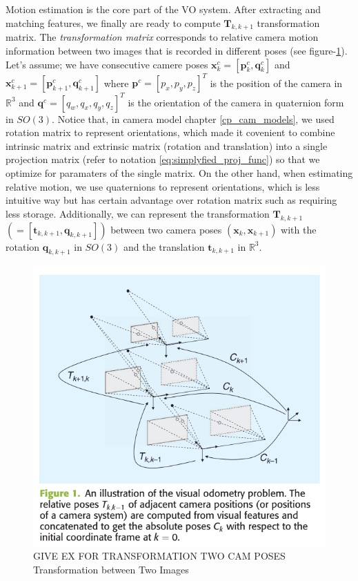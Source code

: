 \documentclass[a4paper]{report}
\numberwithin{figure}{section}
\newcommand{\R}{\mathbb{R}}
\begin{document}
Motion estimation is the core part of the VO system. After 
extracting and matching features,
we finally are ready to compute $\mathbf{T}_{k, k+1}$ transformation matrix. 
The \textit{transformation matrix} corresponds to relative camera motion information between 
two images that is recorded in different poses (see figure-\ref{fig:transformation_ij}).
Let's assume; we have 
consecutive camere poses $\mathbf{x}_k^c = [\mathbf{p}_k^c, \mathbf{q}_k^c]$ and 
$\mathbf{x}_{k+1}^c = [\mathbf{p}_{k+1}^c, \mathbf{q}_{k+1}^c]$ where 
$\mathbf{p}^c = [p_x, p_y, p_z]^T$ is the position of the camera in $\R^3$
and $\mathbf{q}^c = [q_w, q_x, q_y, q_z]^T$ is 
the orientation of the camera in quaternion form in $SO(3)$. 
Notice that, in camera model chapter 
\ref{cp_cam_models}, we used rotation matrix to represent orientations, 
which made it covenient to combine intrinsic matrix and extrinsic matrix 
(rotation and translation) into a single projection matrix 
(refer to notation \ref{eq:simplyfied_proj_func})
so that 
we optimize for paramaters of the single matrix. On the other hand, when 
estimating relative motion, we use quaternions to represent orientations, 
which is less intuitive way but 
has certain advantage over rotation matrix such as requiring less storage.
Additionally, we can represent the transformation 
$\mathbf{T}_{k,k+1}$ $(= [\mathbf{t}_{k,k+1},\mathbf{q}_{k,k+1}])$ between two camera poses 
$(\mathbf{x}_k,\mathbf{x}_{k+1})$ with the rotation $\mathbf{q}_{k,k+1}$ in $SO(3)$  
and the translation $\mathbf{t}_{k,k+1}$ in $\R^3$.

\begin{figure}[H]
	\centering
  \includegraphics[width=0.7\linewidth,natwidth=640,natheight=640]
  {fig/ref_imgs/transformation_ij.png}
  \caption{GIVE EX FOR TRANSFORMATION TWO CAM POSES Transformation between Two Images}
	\label{fig:transformation_ij}
\end{figure}
\end{document}
